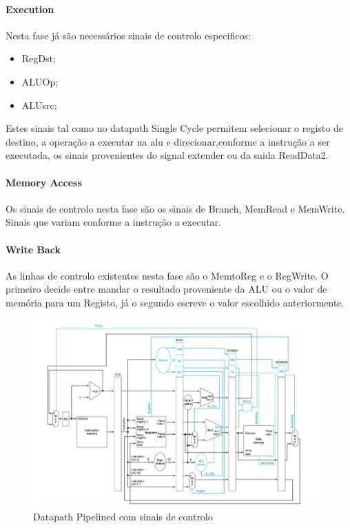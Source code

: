 \documentclass[10pt,a4paper]{book}
\begin{document}
		\paragraph{Execution} Nesta fase já são necessários sinais de controlo especificos:
		\begin{itemize}
			\item RegDst;
			\item ALUOp;
			\item ALUsrc;
		\end{itemize}

		Estes sinais tal como no datapath Single Cycle permitem selecionar o registo de destino, a operação a executar na alu e direcionar,conforme a instrução a ser executada, os sinais provenientes do signal extender ou da saida ReadData2.

		\paragraph{Memory Access} Os sinais de controlo nesta fase são os sinais de Branch, MemRead e MemWrite. Sinais que variam conforme a instrução a executar.

		\paragraph{Write Back} As linhas de controlo existentes nesta fase são o MemtoReg e o RegWrite. O primeiro decide entre mandar o resultado proveniente da ALU ou  o valor de memória para um Registo, já o segundo escreve o valor escolhido anteriormente.

		\begin{figure}[htp]
				\centering
				\includegraphics[scale=0.4]{pipeline5.png}
				\caption{Datapath Pipelined com sinais de controlo}
				\label{simple-pipelined-ctl}
		\end{figure}
\end{document}

